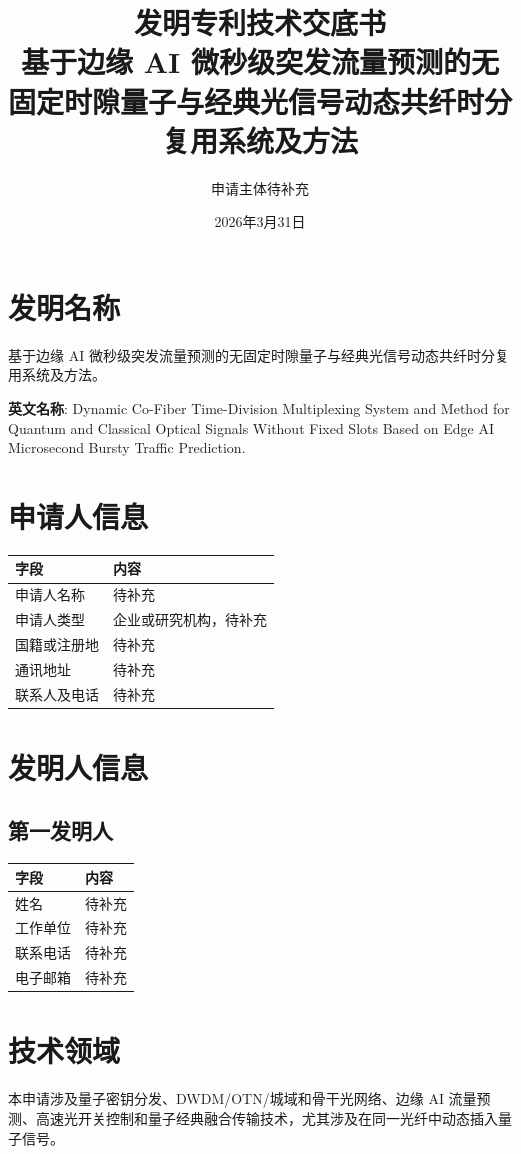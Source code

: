 ﻿\documentclass[12pt,a4paper]{article}
\title{\textbf{发明专利技术交底书}\\[0.5em]\Large 基于边缘 AI 微秒级突发流量预测的无固定时隙量子与经典光信号动态共纤时分复用系统及方法}
\author{申请主体待补充}
\date{2026年3月31日}
\begin{document}
\maketitle
\tableofcontents
\newpage
\section{发明名称}
基于边缘 AI 微秒级突发流量预测的无固定时隙量子与经典光信号动态共纤时分复用系统及方法。

\textbf{英文名称}: Dynamic Co-Fiber Time-Division Multiplexing System and Method for Quantum and Classical Optical Signals Without Fixed Slots Based on Edge AI Microsecond Bursty Traffic Prediction.

\section{申请人信息}
\begin{tabular}{|p{4cm}|p{8cm}|}
\hline
字段 & 内容 \\
\hline
申请人名称 & 待补充 \\
\hline
申请人类型 & 企业或研究机构，待补充 \\
\hline
国籍或注册地 & 待补充 \\
\hline
通讯地址 & 待补充 \\
\hline
联系人及电话 & 待补充 \\
\hline
\end{tabular}

\section{发明人信息}
\subsection{第一发明人}
\begin{tabular}{|p{4cm}|p{8cm}|}
\hline
字段 & 内容 \\
\hline
姓名 & 待补充 \\
\hline
工作单位 & 待补充 \\
\hline
联系电话 & 待补充 \\
\hline
电子邮箱 & 待补充 \\
\hline
\end{tabular}

\section{技术领域}
本申请涉及量子密钥分发、DWDM/OTN/城域和骨干光网络、边缘 AI 流量预测、高速光开关控制和量子经典融合传输技术，尤其涉及在同一光纤中动态插入量子信号。
\end{document}
